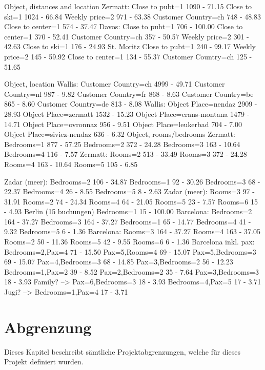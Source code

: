 Object, distances and location
	Zermatt: 	Close to pubt=1				1090 - 71.15
				Close to ski=1				1024 - 66.84
				Weekly price=2				971 - 63.38
				Customer Country=ch			748 - 48.83
				Close to center=1			574 - 37.47
	Davos: 		Close to pubt=1				706 - 100.00
				Close to center=1			370 - 52.41
				Customer Country=ch			357 - 50.57
				Weekly price=2				301 - 42.63
				Close to ski=1				176 - 24.93
	St. Moritz	Close to pubt=1				240 - 99.17
				Weekly price=2				145 - 59.92
				Close to center=1			134 - 55.37
				Customer Country=ch			125 - 51.65

Object, location				
	Wallis: 	Customer Country=ch			4999 - 49.71
				Customer Country=nl			987 - 9.82
				Customer Country=fr			868 - 8.63
				Customer Country=be			865 - 8.60
				Customer Country=de			813 - 8.08
	Wallis: 
				Object Place=nendaz			2909 - 28.93
				Object Place=zermatt		1532 - 15.23
				Object Place=crans-montana	1479 - 14.71
				Object Place=ovronnaz		956 - 9.51
				Object Place=leukerbad		704 - 7.00
				Object Place=siviez-nendaz	636 - 6.32
Object, rooms/bedrooms
	Zermatt: 	Bedrooms=1			877 - 57.25
				Bedrooms=2			372 - 24.28
				Bedrooms=3			163 - 10.64
				Bedrooms=4			116 - 7.57
	Zermatt:
				Rooms=2				513 - 33.49
				Rooms=3				372 - 24.28
				Rooms=4				163 - 10.64
				Rooms=5				105 - 6.85
				
	Zadar (meer): 	Bedrooms=2		106 - 34.87
					Bedrooms=1		92 - 30.26
					Bedrooms=3		68 - 22.37
					Bedrooms=4		26 - 8.55
					Bedrooms=5		8 - 2.63
	Zadar (meer):	Rooms=3			97 - 31.91
					Rooms=2			74 - 24.34
					Rooms=4			64 - 21.05
					Rooms=5			23 - 7.57
					Rooms=6			15 - 4.93
	Berlin (15 buchungen) 	Bedrooms=1			15 - 100.00
	Barcelona:		Bedrooms=2		164 - 37.27
					Bedrooms=3		164 - 37.27
					Bedrooms=1		65 - 14.77
					Bedrooms=4		41 - 9.32
					Bedrooms=5		6 - 1.36
	Barcelona:		Rooms=3			164 - 37.27
					Rooms=4			163 - 37.05
					Rooms=2			50 - 11.36
					Rooms=5			42 - 9.55
					Rooms=6			6 - 1.36
		Barcelona inkl. pax:
					Bedrooms=2,Pax=4		71 - 15.50
					Pax=5,Rooms=4			69 - 15.07
					Pax=5,Bedrooms=3		69 - 15.07
					Pax=4,Bedrooms=3		68 - 14.85
					Pax=3,Bedrooms=2		56 - 12.23
					Bedrooms=1,Pax=2		39 - 8.52
					Pax=2,Bedrooms=2		35 - 7.64
					Pax=3,Bedrooms=3		18 - 3.93
Family? -->			Pax=6,Bedrooms=3		18 - 3.93
					Bedrooms=4,Pax=5		17 - 3.71
Jugi? -->			Bedrooms=1,Pax=4		17 - 3.71


\section{Abgrenzung}
\label{sec:einleitung:abgrenzung}
Dieses Kapitel beschreibt sämtliche Projektabgrenzungen, welche für dieses Projekt definiert
wurden.


